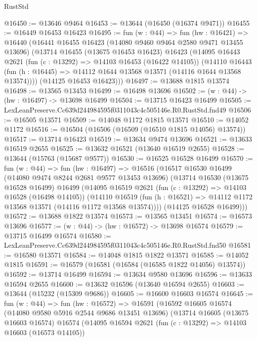 \begin{lexlean}{RustStd}
\begin{coremodule}
@16450 := @13646 @9464
@16453 := @13644 (@16450 (@16374 @9471))
@16455 := @16449 @16453 @16423
@16495 := fun (w : @44) =>
  fun (hw : @16421) =>
  @16440
    (@16441
      @16455
      @16423
      (@14080 @9460 @9464 @2580 @9471 @13455 @13696)
      (@13714
        @16455
        (@13675 @16453 @16423)
        @16423
        (@14095
          @16443
          @2621
          (fun (c : @13292) => @14103 @16453 (@16422 @14105))
          (@14110
            @16443
            (fun (h : @16445) => @14112 @1644 @13568 @13571 (@14116 @1644 @13568 @13574))))
        (@14125 @16453 @16423)))
@16497 := @13688 @1815 @13574
@16498 := @13565 @13453
@16499 := @16498 @13696
@16502 := (w : @44) -> (hw : @16497) -> @13698 @16499
@16504 := @13715 @16423 @16499
@16505 := LexLeanPreserve.Cc639d244984595f0311043c4c505146e.R0.RustStd.fnd49
@16506 := @16505 @13571
@16509 := @14048 @1172 @1815 @13571
@16510 := @14052 @1172
@16516 := @16504 (@16506 (@16509 (@16510 @1815 @14056) @13574))
@16517 := @13714 @16423
@16519 := @13634 @9474 @13696
@16521 := @13633 @16519 @2655
@16525 := @13632 @16521 (@13640 @16519 @2655)
@16528 := @13644 (@15763 (@15687 @9577))
@16530 := @16525 @16528 @16499
@16570 := fun (w : @44) =>
  fun (hw : @16497) =>
  @16516
    (@16517
      @16530
      @16499
      (@14080 @9474 @8244 @2681 @9577 @13453 @13696)
      (@13714
        @16530
        (@13675 @16528 @16499)
        @16499
        (@14095
          @16519
          @2621
          (fun (c : @13292) => @14103 @16528 (@16498 @14105))
          (@14110
            @16519
            (fun (h : @16521) => @14112 @1172 @13568 @13571 (@14116 @1172 @13568 @13574))))
        (@14125 @16528 @16499)))
@16572 := @13688 @1822 @13574
@16573 := @13565 @13451
@16574 := @16573 @13696
@16577 := (w : @44) -> (hw : @16572) -> @13698 @16574
@16579 := @13715 @16499 @16574
@16580 := LexLeanPreserve.Cc639d244984595f0311043c4c505146e.R0.RustStd.fnd50
@16581 := @16580 @13571
@16584 := @14048 @1815 @1822 @13571
@16585 := @14052 @1815
@16591 := @16579 (@16581 (@16584 (@16585 @1822 @14056) @13574))
@16592 := @13714 @16499
@16594 := @13634 @9580 @13696
@16596 := @13633 @16594 @2655
@16600 := @13632 @16596 (@13640 @16594 @2655)
@16603 := @13644 (@15232 (@15309 @9686))
@16605 := @16600 @16603 @16574
@16645 := fun (w : @44) =>
  fun (hw : @16572) =>
  @16591
    (@16592
      @16605
      @16574
      (@14080 @9580 @5916 @2544 @9686 @13451 @13696)
      (@13714
        @16605
        (@13675 @16603 @16574)
        @16574
        (@14095
          @16594
          @2621
          (fun (c : @13292) => @14103 @16603 (@16573 @14105))

\end{coremodule}
\end{lexlean}
